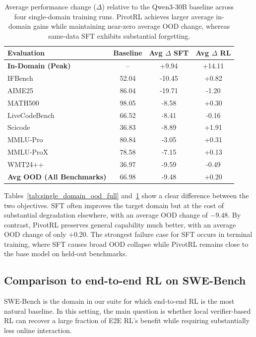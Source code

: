 \begin{table}[t]
\centering
\small
\begin{tabular}{l c cc}
\toprule
\textbf{Evaluation} & \textbf{Baseline} & \textbf{Avg $\Delta$ SFT} & \textbf{Avg $\Delta$ RL} \\
\midrule
\textbf{In-Domain (Peak)} & -- & +9.94 & +14.11 \\
\midrule
IFBench        & 52.04 & -10.45 & +0.82 \\
AIME25         & 86.04 & -19.71 & -1.20 \\
MATH500        & 98.05 & -8.58  & +0.30 \\
LiveCodeBench  & 66.52 & -8.41  & -0.16 \\
Scicode        & 36.83 & -8.89  & +1.91 \\
MMLU-Pro       & 80.84 & -3.05  & +0.31 \\
MMLU-ProX      & 78.58 & -7.15  & +0.13 \\
WMT24++        & 36.97 & -9.59  & -0.49 \\
\midrule
\textbf{Avg OOD (All Benchmarks)} & 66.98 & -9.48 & +0.20 \\
\bottomrule
\end{tabular}
\caption{
Average performance change ($\Delta$) relative to the Qwen3-30B baseline across four single-domain training runs.
PivotRL achieves larger average in-domain gains while maintaining near-zero average OOD change, whereas same-data SFT exhibits substantial forgetting.
}
\label{tab:single_domain_ood_avg}
\end{table}

Tables~\ref{tab:single_domain_ood_full} and~\ref{tab:single_domain_ood_avg} show a clear difference between the two objectives. SFT often improves the target domain but at the cost of substantial degradation elsewhere, with an average OOD change of $-9.48$. By contrast, PivotRL preserves general capability much better, with an average OOD change of only +0.20. The strongest failure case for SFT occurs in terminal training, where SFT causes broad OOD collapse while PivotRL remains close to the base model on held-out benchmarks.

\subsection{Comparison to end-to-end RL on SWE-Bench}
\label{sec:swe_e2e}

SWE-Bench is the domain in our suite for which end-to-end RL is the most natural baseline. In this setting, the main question is whether local verifier-based RL can recover a large fraction of E2E RL's benefit while requiring substantially less online interaction.

